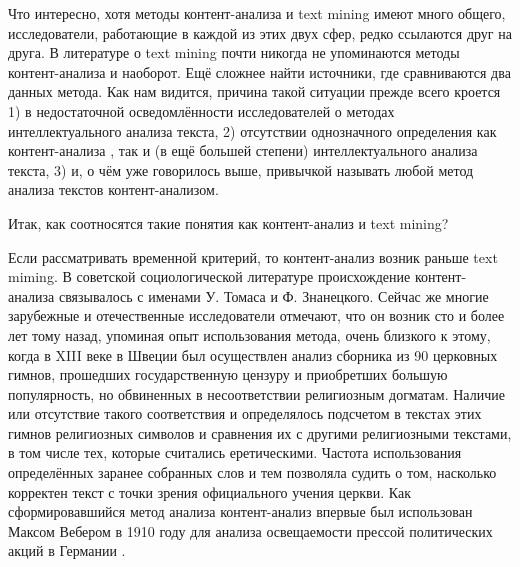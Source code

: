 Что интересно, хотя методы контент-анализа и text mining имеют много общего, исследователи, работающие в каждой из этих двух сфер, редко ссылаются друг на друга. В литературе о text mining почти никогда не упоминаются методы контент-анализа и наоборот. Ещё сложнее найти источники, где сравниваются два данных метода. Как нам видится, причина такой ситуации прежде всего кроется 1) в недостаточной осведомлённости исследователей о методах интеллектуального анализа текста, 2) отсутствии однозначного определения как контент-анализа \cite[стр. 156]{Lande2006}, так и (в ещё большей степени) интеллектуального анализа текста, 3) и, о чём уже говорилось выше, привычкой называть любой метод анализа текстов контент-анализом.




Итак, как соотносятся такие понятия как контент-анализ и text mining?

Если рассматривать временной критерий, то контент-анализ возник раньше text miming. В советской социологической литературе происхождение контент-анализа связывалось с именами У. Томаса и Ф. Знанецкого. Сейчас же многие зарубежные\cite{Smith2000} и отечественные\cite{Pochepcov1998} исследователи отмечают, что он возник сто и более лет тому назад, упоминая опыт использования метода, очень близкого к этому, когда в XIII веке в Швеции был осуществлен анализ сборника из 90 церковных гимнов, прошедших государственную цензуру и приобретших большую популярность, но обвиненных в несоответствии религиозным догматам. Наличие или отсутствие такого соответствия и определялось подсчетом в текстах этих гимнов религиозных символов и сравнения их с другими религиозными текстами, в том числе тех, которые считались еретическими. Частота использования определённых заранее собранных слов и тем позволяла судить о том, насколько корректен текст с точки зрения официального учения церкви. Как сформировавшийся метод анализа контент-анализ впервые был использован Максом Вебером в 1910 году для анализа освещаемости прессой политических акций в Германии \cite[стр. 155]{Lande2006}.

